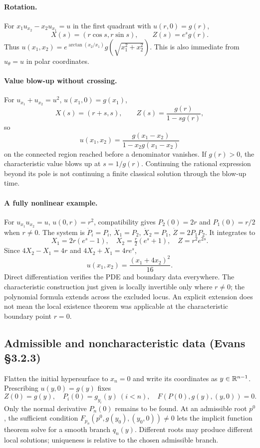 \paragraph{Rotation.}
For $x_1u_{x_2}-x_2u_{x_1}=u$ in the first quadrant with
$u(r,0)=g(r)$,
\[
 X(s)=(r\cos s,r\sin s),\qquad Z(s)=e^s g(r).
\]
Thus
$u(x_1,x_2)=e^{\arctan(x_2/x_1)}g(\sqrt{x_1^2+x_2^2})$.
This is also immediate from $u_\theta=u$ in polar coordinates.

\paragraph{Value blow-up without crossing.}
For $u_{x_1}+u_{x_2}=u^2$, $u(x_1,0)=g(x_1)$,
\[
 X(s)=(r+s,s),\qquad Z(s)=\frac{g(r)}{1-sg(r)},
\]
so
\[
 u(x_1,x_2)=\frac{g(x_1-x_2)}
                      {1-x_2g(x_1-x_2)}
\]
on the connected region reached before a denominator vanishes.
If $g(r)>0$, the characteristic value blows up at $s=1/g(r)$.
Continuing the rational expression beyond its pole is not continuing
a finite classical solution through the blow-up time.
\Needspace{45mm}

\paragraph{A fully nonlinear example.}
For $u_{x_1}u_{x_2}=u$, $u(0,r)=r^2$, compatibility gives
$P_2(0)=2r$ and $P_1(0)=r/2$ when $r\ne0$.
The system is $\dot P_i=P_i$, $\dot X_1=P_2$,
$\dot X_2=P_1$, $\dot Z=2P_1P_2$.
It integrates to
\[
 X_1=2r(e^s-1),\quad X_2=\tfrac r2(e^s+1),\quad Z=r^2e^{2s}.
\]
Since $4X_2-X_1=4r$ and $4X_2+X_1=4re^s$,
\[
 u(x_1,x_2)=\frac{(x_1+4x_2)^2}{16}.
\]
Direct differentiation verifies the PDE and boundary data everywhere.
The characteristic construction just given is locally invertible only
where $r\ne0$; the polynomial formula extends across the excluded locus.
An explicit extension does not mean the local existence theorem was
applicable at the characteristic boundary point $r=0$.

\subsection{Admissible and noncharacteristic data (Evans \S3.2.3)}
Flatten the initial hypersurface to $x_n=0$ and write its coordinates
as $y\in\mathbb{R}^{n-1}$. Prescribing $u(y,0)=g(y)$ fixes
\[
 Z(0)=g(y),\quad P_i(0)=g_{y_i}(y)\ (i<n),\quad
 F(P(0),g(y),(y,0))=0.
 \tag{IC}
\]
Only the normal derivative $P_n(0)$ remains to be found.
At an admissible root $p^0$, the sufficient condition
$F_{p_n}(p^0,g(y_0),(y_0,0))\ne0$
lets the implicit function theorem solve for a smooth branch $q_n(y)$.
Different roots may produce different local solutions; uniqueness is
relative to the chosen admissible branch.
\Needspace{45mm}

